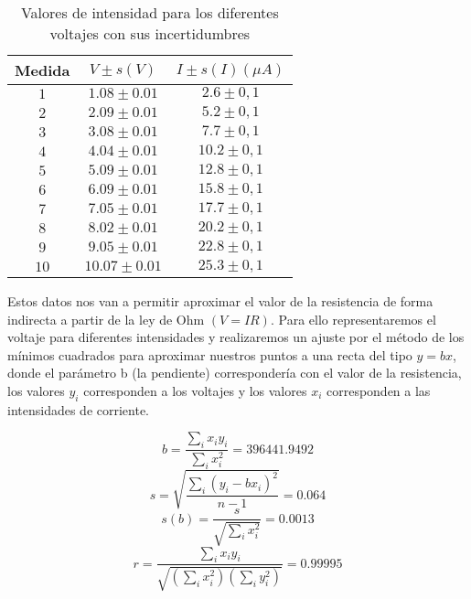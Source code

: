 \documentclass[a4paper,12pt,titlepage]{article}
\begin{document}
\begin{table}[ht]  %
\begin{center}
    \begin{tabular}{|c|c|c|}
    \hline
    Medida & $V \pm s(V)$ & $I \pm s(I)(\mu A)$ \\ \hline
    $1$ & $1.08 \pm 0.01$ & $2.6 \pm 0,1$ \\ \hline
    $2$ & $2.09 \pm 0.01$ & $5.2\pm 0,1$ \\ \hline
    $3$ & $3.08 \pm 0.01$ & $7.7\pm 0,1$ \\ \hline
    $4$ & $4.04 \pm 0.01$ & $10.2\pm 0,1$ \\ \hline
    $5$ & $5.09 \pm 0.01$ & $12.8\pm 0,1 $ \\ \hline
    $6$ & $6.09 \pm 0.01$ & $15.8 \pm 0,1$\\ \hline
    $7$ & $7.05 \pm 0.01$ & $17.7\pm 0,1$ \\ \hline
    $8$ & $8.02 \pm 0.01$ & $20.2 \pm 0,1$ \\ \hline
    $9$ & $9.05 \pm 0.01$ & $22.8 \pm 0,1$ \\ \hline
    $10$ & $10.07 \pm 0.01$ & $25.3\pm 0,1$ \\ \hline
    \end{tabular}
    \captionsetup{justification=centering}  %
    \caption{Valores de intensidad para los diferentes voltajes con sus incertidumbres}
    \end{center}
\end{table}

\newpage

Estos datos nos van a permitir aproximar el valor de la resistencia de forma indirecta a partir de la ley de Ohm $(V=IR)$. Para ello representaremos el voltaje para diferentes intensidades y realizaremos un ajuste por el método de los mínimos cuadrados para aproximar nuestros puntos a una recta del tipo $y=bx$, donde el parámetro b (la pendiente) correspondería con el valor de la resistencia, los valores $y_{i}$ corresponden a los voltajes y los valores $x_{i}$ corresponden a las intensidades de corriente.

\begin{equation}
    b=\frac{\sum_{i}x_{i}y_{i}}{\sum_{i}x_{i}^2}=396441.9492
\end{equation}
\begin{equation}
    s=\sqrt{\frac{\sum_{i}(y_{i}-bx_{i})^2}{n-1}}=0.064
\end{equation}
\begin{equation}
    s(b)=\frac{s}{\sqrt{\sum_{i}x_{i}^2}}=0.0013
\end{equation}
\begin{equation}
    r=\frac{\sum_{i}x_{i}y_{i}}{\sqrt{(\sum_{i}x_{i}^2)(\sum_{i}y_{i}^2)}}=0.99995
\end{equation}
\end{document}
